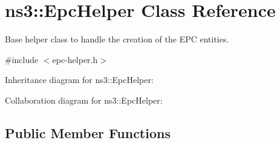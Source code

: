 \hypertarget{classns3_1_1EpcHelper}{}\section{ns3\+:\+:Epc\+Helper Class Reference}
\label{classns3_1_1EpcHelper}


Base helper class to handle the creation of the E\+PC entities.  




{\ttfamily \#include $<$epc-\/helper.\+h$>$}



Inheritance diagram for ns3\+:\+:Epc\+Helper\+:


Collaboration diagram for ns3\+:\+:Epc\+Helper\+:
\subsection*{Public Member Functions}
